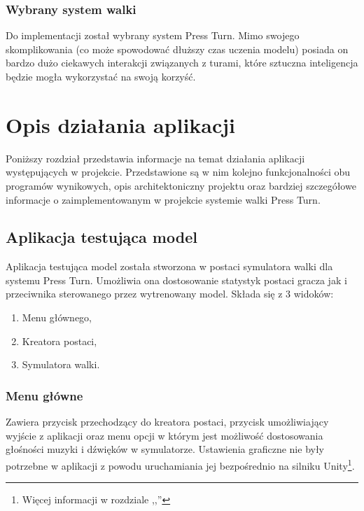 \documentclass{SGGW-thesis}
\begin{document}
\subsection*{Wybrany system walki}
Do implementacji został wybrany system Press Turn. Mimo swojego skomplikowania (co może spowodować dłuższy czas uczenia modelu) posiada on bardzo dużo ciekawych interakcji związanych z turami, które sztuczna inteligencja będzie mogła wykorzystać na swoją korzyść.

\chapter{Opis działania aplikacji}
Poniższy rozdział przedstawia informacje na temat działania aplikacji występujących w projekcie. Przedstawione są w nim kolejno funkcjonalności obu programów wynikowych, opis architektoniczny projektu oraz bardziej szczegółowe informacje o zaimplementowanym w projekcie systemie walki Press Turn.

\section{Aplikacja testująca model}
Aplikacja testująca model została stworzona w postaci symulatora walki dla systemu Press Turn. Umożliwia ona dostosowanie statystyk postaci gracza jak i przeciwnika sterowanego przez wytrenowany model.
Składa się z 3 widoków:
\begin{enumerate}
  \item Menu głównego,
  \item Kreatora postaci,
  \item Symulatora walki.
\end{enumerate}

\subsection{Menu główne}
Zawiera przycisk przechodzący do kreatora postaci, przycisk umożliwiający wyjście z aplikacji oraz menu opcji w którym jest możliwość dostosowania głośności muzyki i dźwięków w symulatorze.
Ustawienia graficzne nie były potrzebne w aplikacji z powodu uruchamiania jej bezpośrednio na silniku Unity\footnote{Więcej informacji w rozdziale ,,''}.
\end{document}
